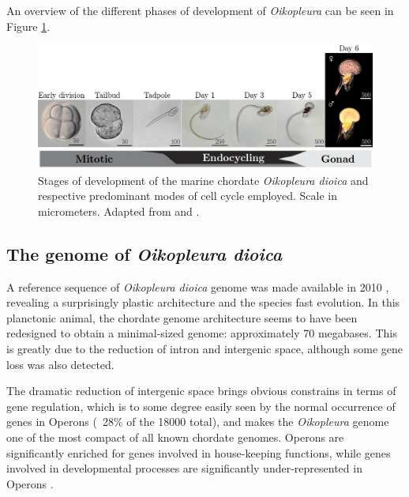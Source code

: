 \documentclass[11pt,twoside,a4paper]{report}
\begin{document}
		An overview of the different phases of development of \textit{Oikopleura} can be seen in 	Figure \ref{fig:LifeCycle}.
		
		\begin{figure}[here]
			\centering
			\includegraphics[width=1\textwidth]{pngs/lifeCycle.png}
			\caption{
				Stages of development of the marine chordate \textit{Oikopleura dioica} and respective predominant modes of cell cycle employed.
				{\footnotesize
					Scale in micrometers. Adapted from \cite{Fujii2008} and \cite{Bouquet2009}.
				}
			}
			\label{fig:LifeCycle}
		\end{figure}
		

		\subsection{The genome of \textit{Oikopleura dioica}}
		A reference sequence of \textit{Oikopleura dioica} genome was made available in 2010 \cite{Denoeud2010a}, revealing a surprisingly plastic architecture and the species fast evolution. In this planctonic animal, the chordate genome architecture seems to have been redesigned to obtain a minimal-sized genome: approximately 70 megabases. This is greatly due to the reduction of intron and intergenic space, although some gene loss was also detected.
		
		The dramatic reduction of intergenic space brings obvious constrains in terms of gene regulation, which is to some degree easily seen by the normal occurrence of genes in Operons (~28\% of the 18000 total), and makes the \textit{Oikopleura} genome one of the most compact of all known chordate genomes. Operons are significantly enriched for genes involved in house-keeping functions, while genes involved in developmental processes are significantly under-represented in Operons \cite{Denoeud2010a}.
\end{document}
